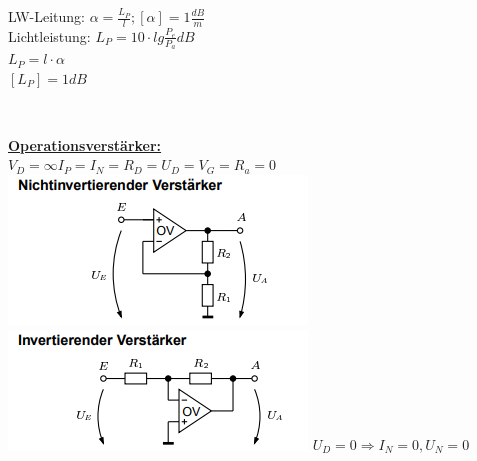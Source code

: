\documentclass[11pt]{article}
\begin{document}
\begin{minipage}{0.33\textwidth}
LW-Leitung: $\alpha = \frac{L_P}{l}; [\alpha] = 1 \frac{dB}{m}$\\
Lichtleistung: $L_P = 10 \cdot lg\frac{P_e}{P_a} dB$\\
\phantom{sssssississsssss} $L_P = l \cdot \alpha$\\
\phantom{sssssississsssss}$ [L_P] = 1dB$\\



\end{minipage}%
~~~~~~
\begin{minipage}{0.33\textwidth}
\underline{\textbf{Operationsverstärker:}}\\
$V_D = \infty I_P=I_N=R_D=U_D=V_G=R_a=0$\\
\includegraphics[scale=0.40]{NIOV.png}
\includegraphics[scale=0.40]{IOV.png}
$U_D = 0 \Rightarrow I_N = 0, U_N = 0$\\


\end{minipage}
\end{document}
